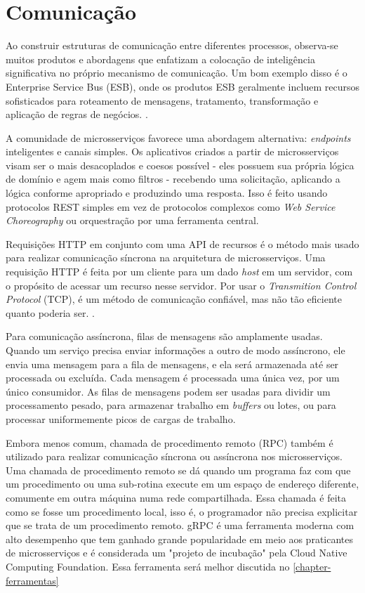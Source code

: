 \section{Comunicação}

Ao construir estruturas de comunicação entre diferentes processos, observa-se muitos produtos e abordagens que enfatizam a colocação de inteligência significativa no próprio mecanismo de comunicação. Um bom exemplo disso é o Enterprise Service Bus (ESB), onde os produtos ESB geralmente incluem recursos sofisticados para roteamento de mensagens, tratamento, transformação e aplicação de regras de negócios. \cite{MartinFowlerMicroservices}.

A comunidade de microsserviços favorece uma abordagem alternativa: \emph{endpoints} inteligentes e canais simples. Os aplicativos criados a partir de microsserviços visam ser o mais desacoplados e coesos possível - eles possuem sua própria lógica de domínio e agem mais como filtros - recebendo uma solicitação, aplicando a lógica conforme apropriado e produzindo uma resposta. Isso é feito usando protocolos REST simples em vez de protocolos complexos como \emph{Web Service Choreography} ou orquestração por uma ferramenta central. \cite{MartinFowlerMicroservices}

Requisições HTTP em conjunto com uma API de recursos é o método mais usado para realizar comunicação síncrona na arquitetura de microsserviços. Uma requisição HTTP é feita por um cliente para um dado \emph{host} em um servidor, com o propósito de acessar um recurso nesse servidor. Por usar o \emph{Transmition Control Protocol} (TCP), é um método de comunicação confiável, mas não tão eficiente quanto poderia ser. \cite{MartinFowlerMicroservices}.

Para comunicação assíncrona, filas de mensagens são amplamente usadas. Quando um serviço precisa enviar informações a outro de modo assíncrono, ele envia uma mensagem para a fila de mensagens, e ela será armazenada até ser processada ou excluída. Cada mensagem é processada uma única vez, por um único consumidor. As filas de mensagens podem ser usadas para dividir um processamento pesado, para armazenar trabalho em \emph{buffers} ou lotes, ou para processar uniformemente picos de cargas de trabalho.

Embora menos comum, chamada de procedimento remoto (RPC) também é utilizado para realizar comunicação síncrona ou assíncrona nos microsserviços. Uma chamada de procedimento remoto se dá quando um programa faz com que um procedimento ou uma sub-rotina execute em um espaço de endereço diferente, comumente em outra máquina numa rede compartilhada. Essa chamada é feita como se fosse um procedimento local, isso é, o programador não precisa explicitar que se trata de um procedimento remoto. gRPC é uma ferramenta moderna com alto desempenho que tem ganhado grande popularidade em meio aos praticantes de microsserviços e é considerada um "projeto de incubação" pela Cloud Native Computing Foundation. Essa ferramenta será melhor discutida no \autoref{chapter-ferramentas} \cite{microsoft-grpc}

